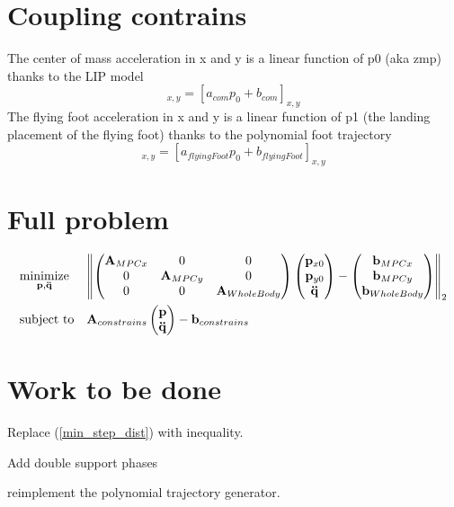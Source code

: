\documentclass[10pt,a4paper]{article}
\begin{document}
\section*{Coupling contrains}
    The center of mass acceleration in x and y is a linear function of p0 (aka zmp) thanks to the LIP model
    \begin{equation}
        [{J}_{com} \ddot{q}+\dot{J}_{com} \dot{q}]_{x,y}=[a_{com}p_0+b_{com}]_{x,y}
    \end{equation}
    The flying foot acceleration in x and y is a linear function of p1 (the landing placement of the flying foot) thanks to the polynomial foot trajectory
    \begin{equation}
        [{J}_{flyingFoot} \ddot{q}+\dot{J}_{flyingFoot} \dot{q}]_{x,y}=[a_{flyingFoot}p_0+b_{flyingFoot}]_{x,y}
    \end{equation}
    \section*{Full problem}
    \begin{equation*}
    \begin{aligned}
    & \underset{\bold{p},\bold{\ddot{q}}}{\text{minimize}}
    & & \norm{
        \begin{pmatrix} 
             \bold{A}_{MPC x}     & 0 	 & 0\\
             0         & \bold{A}_{MPC y} & 0 \\
             0         & 0 &  \bold{A}_{WholeBody}
            \end{pmatrix}
        \begin{pmatrix} 
            \bold{p}_{x0} \\
            \bold{p}_{y0} \\
            \bold{\ddot{q}
            }
        \end{pmatrix}
        - \begin{pmatrix} 
            \bold{b}_{MPC x}\\
            \bold{b}_{MPC y}\\
            \bold{b}_{WholeBody}
        \end{pmatrix}	
    }_2 \\
    & \text{subject to}
    & & {\bold{A}_{constrains}\begin{pmatrix} 
            \bold{p} \\
            \bold{\ddot{q}}
        \end{pmatrix}- \bold{b}_{constrains}} 	
    \end{aligned}
    \end{equation*}

\section*{Work to be done}
Replace (\ref{min_step_dist}) with inequality.

Add double support phases

reimplement the polynomial trajectory generator.
\end{document}
